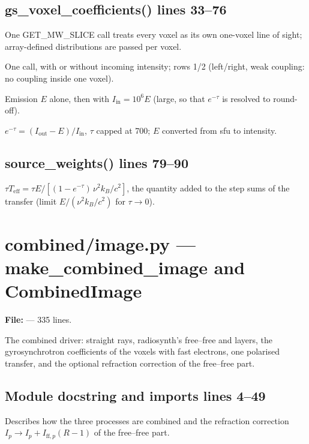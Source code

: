 \section*{\normalsize gs\_voxel\_coefficients() \hfill{\small\mdseries\color{gray}lines 33--76}}

\begin{lines}
\item[L.51–58] One GET\_MW\_SLICE call treats every voxel as its own one-voxel line of sight; array-defined distributions are passed per voxel.
\item[L.61–67] One call, with or without incoming intensity; rows 1/2 (left/right, weak coupling: no coupling inside one voxel).
\item[L.69–71] Emission $E$ alone, then with $I_\text{in}=10^6E$ (large, so that $e^{-\tau}$ is resolved to round-off).
\item[L.73–75] $e^{-\tau}=(I_\text{out}-E)/I_\text{in}$, $\tau$ capped at 700; $E$ converted from sfu to intensity.
\end{lines}
\section*{\normalsize source\_weights() \hfill{\small\mdseries\color{gray}lines 79--90}}

$\tau T_\text{eff}=\tau E/[(1-e^{-\tau})\,\nu^2k_B/c^2]$, the quantity added to the step sums of the transfer (limit $E/(\nu^2k_B/c^2)$ for $\tau\to0$).


\chapter{combined/image.py --- make\_combined\_image and CombinedImage}
\label{mod:combined:image.py}
\textbf{File:}  --- 335 lines.

The combined driver: straight rays, radiosynth's free--free and layers, the
gyrosynchrotron coefficients of the voxels with fast electrons, one polarised transfer,
and the optional refraction correction of the free--free part.

\section*{\normalsize Module docstring and imports \hfill{\small\mdseries\color{gray}lines 4--49}}

Describes how the three processes are combined and the refraction correction $I_p\to I_p+I_{\text{ff},p}(R-1)$ of the free--free part.

